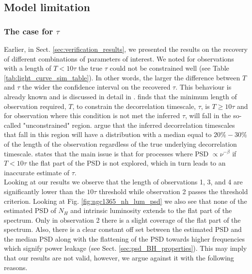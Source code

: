 \documentclass{aa}
\begin{document}
\subsection{Model limitation}
\label{sec:limitation}
\subsubsection{The case for $\tau$}
Earlier, in Sect. \ref{sec:verification_results}, we presented the results on the recovery of different combinations of parameters of interest. We noted for observations with a length of $T<10\tau$ the true $\tau$ could not be constrained well (see Table \ref{tab:light_curve_sim_table}). In other words, the larger the difference between $T$ and $\tau$ the wider the confidence interval on the recovered $\tau$. This behaviour is already known and is discussed in detail in \citet{Kozlowski2017}. \citet{Kozlowski2017} finds that the minimum length of observation required, $T$, to constrain the decorrelation timescale, $\tau$, is $T \ge 10 \tau$ and for observation where this condition is not met the inferred $\tau$, will fall in the so-called "unconstrained" region. \citet{Kozlowski2017} argue that the inferred decorrelation timescales that fall in this region will have a distribution with a median equal to $20\% - 30\%$ of the length of the observation regardless of the true underlying decorrelation timescale. \citet{Kozlowski2017} states that the main issue is that for processes where PSD $\propto \nu^{-\beta}$ if $T < 10 \tau$ the flat part of the PSD is not explored, which in turn leads to an inaccurate estimate of $\tau$. \\
Looking at our results we observe that the length of observations 1, 3, and 4 are significantly lower than the $10\tau$ threshold while observation 2 passes the threshold criterion. Looking at Fig. \ref{fig:ngc1365_nh_lum_psd} we also see that none of the estimated PSD of $N_H$ and intrinsic luminosity extends to the flat part of the spectrum. Only in observation 2 there is a slight coverage of the flat part of the spectrum. Also, there is a clear constant off set between the estimated PSD and the median PSD along with the flattening of the PSD towards higher frequencies which signify power leakage (see Sect. \ref{sec:psd_BH_properties}). This may imply that our results are not valid, however, we argue against it with the following reasons. \\
\end{document}
